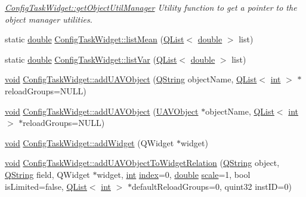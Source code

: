 \begin{DoxyCompactItemize}
\begin{DoxyCompactList}\small\item\em \hyperlink{group___u_a_v_object_widget_utils_gadefdec77400ea7aaed02de03fa044b7a}{Config\-Task\-Widget\-::get\-Object\-Util\-Manager} Utility function to get a pointer to the object manager utilities. \end{DoxyCompactList}\item 
static \hyperlink{_super_l_u_support_8h_a8956b2b9f49bf918deed98379d159ca7}{double} \hyperlink{group___u_a_v_object_widget_utils_ga134c15f52a4eccf9aeb9bbacdc296b80}{Config\-Task\-Widget\-::list\-Mean} (\hyperlink{class_q_list}{Q\-List}$<$ \hyperlink{_super_l_u_support_8h_a8956b2b9f49bf918deed98379d159ca7}{double} $>$ list)
\item 
static \hyperlink{_super_l_u_support_8h_a8956b2b9f49bf918deed98379d159ca7}{double} \hyperlink{group___u_a_v_object_widget_utils_ga2f33179993858ca636461e78e3a7a3c8}{Config\-Task\-Widget\-::list\-Var} (\hyperlink{class_q_list}{Q\-List}$<$ \hyperlink{_super_l_u_support_8h_a8956b2b9f49bf918deed98379d159ca7}{double} $>$ list)
\item 
\hyperlink{group___u_a_v_objects_plugin_ga444cf2ff3f0ecbe028adce838d373f5c}{void} \hyperlink{group___u_a_v_object_widget_utils_ga82f371b1291826ec74341dddfe827c83}{Config\-Task\-Widget\-::add\-U\-A\-V\-Object} (\hyperlink{group___u_a_v_objects_plugin_gab9d252f49c333c94a72f97ce3105a32d}{Q\-String} object\-Name, \hyperlink{class_q_list}{Q\-List}$<$ \hyperlink{ioapi_8h_a787fa3cf048117ba7123753c1e74fcd6}{int} $>$ $\ast$reload\-Groups=N\-U\-L\-L)
\item 
\hyperlink{group___u_a_v_objects_plugin_ga444cf2ff3f0ecbe028adce838d373f5c}{void} \hyperlink{group___u_a_v_object_widget_utils_gac56e252ece21406583d59af2b70c2565}{Config\-Task\-Widget\-::add\-U\-A\-V\-Object} (\hyperlink{class_u_a_v_object}{U\-A\-V\-Object} $\ast$object\-Name, \hyperlink{class_q_list}{Q\-List}$<$ \hyperlink{ioapi_8h_a787fa3cf048117ba7123753c1e74fcd6}{int} $>$ $\ast$reload\-Groups=N\-U\-L\-L)
\item 
\hyperlink{group___u_a_v_objects_plugin_ga444cf2ff3f0ecbe028adce838d373f5c}{void} \hyperlink{group___u_a_v_object_widget_utils_ga3edd7677e362be586b059c066e0a4e30}{Config\-Task\-Widget\-::add\-Widget} (Q\-Widget $\ast$widget)
\item 
\hyperlink{group___u_a_v_objects_plugin_ga444cf2ff3f0ecbe028adce838d373f5c}{void} \hyperlink{group___u_a_v_object_widget_utils_ga8f5d01ae74d161f7b85d123e66c49451}{Config\-Task\-Widget\-::add\-U\-A\-V\-Object\-To\-Widget\-Relation} (\hyperlink{group___u_a_v_objects_plugin_gab9d252f49c333c94a72f97ce3105a32d}{Q\-String} object, \hyperlink{group___u_a_v_objects_plugin_gab9d252f49c333c94a72f97ce3105a32d}{Q\-String} field, Q\-Widget $\ast$widget, \hyperlink{ioapi_8h_a787fa3cf048117ba7123753c1e74fcd6}{int} \hyperlink{glext_8h_ab47dd9958bcadea08866b42bf358e95e}{index}=0, \hyperlink{_super_l_u_support_8h_a8956b2b9f49bf918deed98379d159ca7}{double} \hyperlink{glext_8h_a281421b881aa7a1266842b73a3bc7655}{scale}=1, bool is\-Limited=false, \hyperlink{class_q_list}{Q\-List}$<$ \hyperlink{ioapi_8h_a787fa3cf048117ba7123753c1e74fcd6}{int} $>$ $\ast$default\-Reload\-Groups=0, quint32 inst\-I\-D=0)

\end{DoxyCompactItemize}
